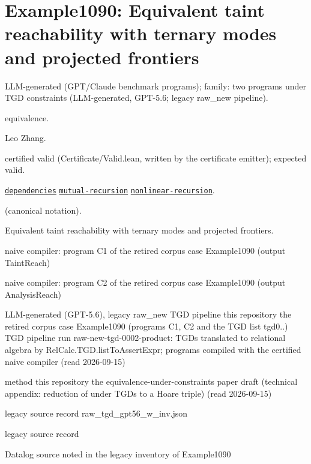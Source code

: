 \documentclass[10pt]{article}
\begin{document}
\Needspace{0.45\textheight}

\section{Example1090: Equivalent taint reachability with ternary modes and projected frontiers}\label{case:Example1090}

\begin{description}[leftmargin=2.6cm,style=nextline,itemsep=1pt]

\item[Category] LLM-generated (GPT/Claude benchmark programs); family: two programs under TGD constraints (LLM-generated, GPT-5.6; legacy raw\_new pipeline).

\item[Kind] equivalence.

\item[Contributors] Leo Zhang.

\item[Status] certified valid (Certificate/Valid.lean, written by the certificate emitter); expected valid.

\item[Tags] \hyperref[tag:dependencies]{\texttt{dependencies}} \hyperref[tag:mutual-recursion]{\texttt{mutual-recursion}} \hyperref[tag:nonlinear-recursion]{\texttt{nonlinear-recursion}}.

\item[Input]  (canonical notation).

\item[Summary] Equivalent taint reachability with ternary modes and projected frontiers.

\item[Sides] naive compiler: program C1 of the retired corpus case Example1090 (output TaintReach) \par naive compiler: program C2 of the retired corpus case Example1090 (output AnalysisReach)

\item[Sources] {\raggedright LLM-generated (GPT-5.6), legacy raw\_new TGD pipeline this repository the retired corpus case Example1090 (programs C1, C2 and the TGD list tgd0..) TGD pipeline run raw-new-tgd-0002-product: TGDs translated to relational algebra by RelCalc.TGD.listToAssertExpr; programs compiled with the certified naive compiler (read 2026-09-15) \par method this repository the equivalence-under-constraints paper draft (technical appendix: reduction of  under TGDs to a Hoare triple) (read 2026-09-15) \par legacy source record raw\_tgd\_gpt56\_w\_inv.json \par legacy source record  \par Datalog source noted in the legacy inventory of Example1090\par}


\end{description}
\end{document}
